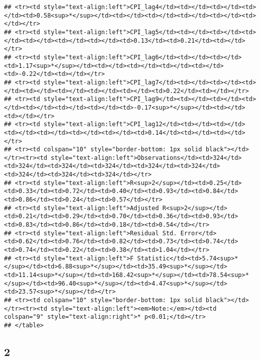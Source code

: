 \documentclass[
]{article}
\begin{document}
\begin{verbatim}
## <tr><td style="text-align:left">CPI_lag4</td><td></td><td></td><td></td><td>0.58<sup>*</sup></td><td></td><td></td><td></td><td></td><td></td></tr>
## <tr><td style="text-align:left">CPI_lag5</td><td></td><td></td><td></td><td></td><td></td><td></td><td>0.13</td><td>0.21</td><td></td></tr>
## <tr><td style="text-align:left">CPI_lag6</td><td></td><td></td><td>1.17<sup>*</sup></td><td></td><td></td><td></td><td></td><td>-0.22</td><td></td></tr>
## <tr><td style="text-align:left">CPI_lag7</td><td></td><td></td><td></td><td></td><td></td><td></td><td></td><td>0.22</td><td></td></tr>
## <tr><td style="text-align:left">CPI_lag9</td><td></td><td></td><td></td><td></td><td></td><td></td><td>-0.17<sup>*</sup></td><td></td><td></td></tr>
## <tr><td style="text-align:left">CPI_lag12</td><td></td><td></td><td></td><td></td><td></td><td></td><td>0.14</td><td></td><td></td></tr>
## <tr><td colspan="10" style="border-bottom: 1px solid black"></td></tr><tr><td style="text-align:left">Observations</td><td>324</td><td>324</td><td>324</td><td>324</td><td>324</td><td>324</td><td>324</td><td>324</td><td>324</td></tr>
## <tr><td style="text-align:left">R<sup>2</sup></td><td>0.25</td><td>0.33</td><td>0.72</td><td>0.40</td><td>0.93</td><td>0.84</td><td>0.86</td><td>0.24</td><td>0.57</td></tr>
## <tr><td style="text-align:left">Adjusted R<sup>2</sup></td><td>0.21</td><td>0.29</td><td>0.70</td><td>0.36</td><td>0.93</td><td>0.83</td><td>0.86</td><td>0.18</td><td>0.54</td></tr>
## <tr><td style="text-align:left">Residual Std. Error</td><td>0.62</td><td>0.76</td><td>0.82</td><td>0.73</td><td>0.74</td><td>0.74</td><td>0.22</td><td>0.38</td><td>1.04</td></tr>
## <tr><td style="text-align:left">F Statistic</td><td>5.74<sup>*</sup></td><td>6.88<sup>*</sup></td><td>35.49<sup>*</sup></td><td>11.14<sup>*</sup></td><td>168.42<sup>*</sup></td><td>78.54<sup>*</sup></td><td>96.40<sup>*</sup></td><td>4.47<sup>*</sup></td><td>23.57<sup>*</sup></td></tr>
## <tr><td colspan="10" style="border-bottom: 1px solid black"></td></tr><tr><td style="text-align:left"><em>Note:</em></td><td colspan="9" style="text-align:right">* p<0.01;</td></tr>
## </table>
\end{verbatim}

\hypertarget{section-1}{%
\subsection{\texorpdfstring{\textbf{2}}{2}}\label{section-1}}
\end{document}
